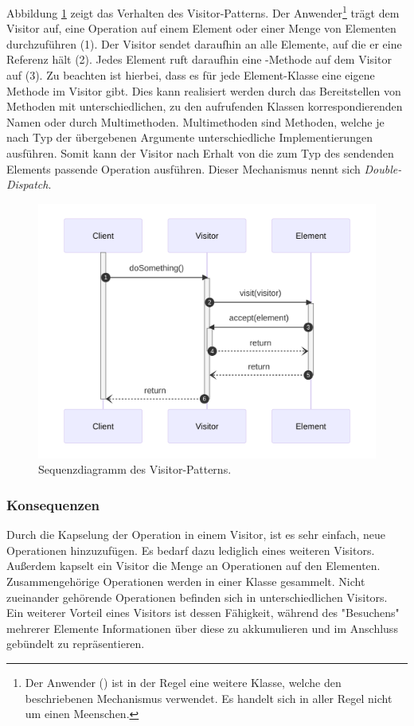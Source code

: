 Abbildung \ref{fig:visitor-seq} zeigt das Verhalten des Visitor-Patterns. Der Anwender\footnote{Der Anwender () ist in der Regel eine weitere Klasse, welche den beschriebenen Mechanismus verwendet. Es handelt sich in aller Regel nicht um einen Meenschen.} trägt dem Visitor auf, eine Operation auf einem Element oder einer Menge von Elementen durchzuführen (1). Der Visitor sendet daraufhin  an alle Elemente, auf die er eine Referenz hält (2). Jedes Element ruft daraufhin eine -Methode auf dem Visitor auf (3). Zu beachten ist hierbei, dass es für jede Element-Klasse eine eigene Methode im Visitor gibt. Dies kann realisiert werden durch das Bereitstellen von Methoden mit unterschiedlichen, zu den aufrufenden Klassen korrespondierenden Namen oder durch Multimethoden. Multimethoden sind Methoden, welche je nach Typ der übergebenen Argumente unterschiedliche Implementierungen ausführen. Somit kann der Visitor nach Erhalt von  die zum Typ des sendenden Elements passende Operation ausführen. Dieser Mechanismus nennt sich \emph{Double-Dispatch}.

\begin{figure}[htbp]
	\centering
	\includegraphics[width=0.75\linewidth]{images/patterns/visitor-seq.png}
	\caption{Sequenzdiagramm des Visitor-Patterns. \cite{skobeleva_visitor_2023}}
	\label{fig:visitor-seq}
\end{figure}

\subsubsection*{Konsequenzen}
Durch die Kapselung der Operation in einem Visitor, ist es sehr einfach, neue Operationen hinzuzufügen. Es bedarf dazu lediglich eines weiteren Visitors. Außerdem kapselt ein Visitor die Menge an Operationen auf den Elementen. Zusammengehörige Operationen werden in einer Klasse gesammelt. Nicht zueinander gehörende Operationen befinden sich in unterschiedlichen Visitors. Ein weiterer Vorteil eines Visitors ist dessen Fähigkeit, während des "Besuchens" mehrerer Elemente Informationen über diese zu akkumulieren und im Anschluss gebündelt zu repräsentieren.

